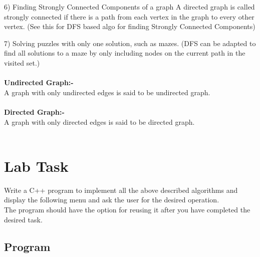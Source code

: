\documentclass[11pt]{article}            %
\begin{document}
6) Finding Strongly Connected Components of a graph A directed graph is called strongly connected if there is a path from each vertex in the graph to every other vertex. (See this for DFS based algo for finding Strongly Connected Components)

7) Solving puzzles with only one solution, such as mazes. (DFS can be adapted to find all solutions to a maze by only including nodes on the current path in the visited set.)
\\ \\


\textbf{Undirected Graph:-}\\
A graph with only undirected edges is said to be undirected graph.
\\ \\

\textbf{Directed Graph:-}\\
A graph with only directed edges is said to be directed graph.
\\ \\

\section{Lab Task }  
Write a C++ program to implement all the above described algorithms and display the following menu and ask the user for the desired operation.\\    The program should have the option for reusing it after you have completed the desired task.

\subsection{Program}     
\end{document}
